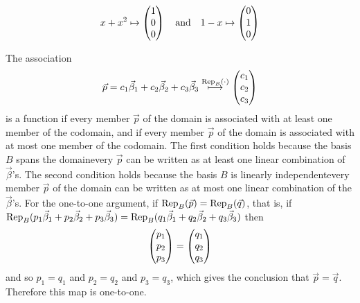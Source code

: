 \begin{exercises}
\begin{exparts}
\begin{equation*}
          x+x^2\mapsto\colvec{1 \\ 0 \\ 0}
          \quad\text{and}\quad
          1-x\mapsto\colvec{0 \\ 1 \\ 0}
        \end{equation*}
    \end{exparts}
    \begin{answer}
      \begin{exparts}
        \partsitem The association
          \begin{equation*}
            \vec{p}=c_1\vec{\beta}_1+c_2\vec{\beta}_2+c_3\vec{\beta}_3
            \mapsunder{\rep{\cdot}{B}}
            \colvec{c_1 \\ c_2 \\ c_3}
          \end{equation*}
          is a function if every member $\vec{p}$ of the domain is associated
          with at least one member of the codomain, and if every member
          $\vec{p}$ of the
          domain is associated with at most one member of the codomain.
          The first condition
          holds because the basis $B$ spans the domain\Dash every
          $\vec{p}$ can be written as at least one linear combination of
          $\vec{\beta}$'s.
          The second condition holds because the basis $B$ is linearly
          independent\Dash every member $\vec{p}$ 
          of the domain can be written as
          at most one linear combination of the $\vec{\beta}$'s.
        \partsitem For the one-to-one argument,
          if $\rep{\vec{p}}{B}=\rep{\vec{q}}{B}$, that is, if
          \( \rep{p_1\vec{\beta}_1+p_2\vec{\beta}_2+p_3\vec{\beta}_3}{B}
             =\rep{q_1\vec{\beta}_1+q_2\vec{\beta}_2+q_3\vec{\beta}_3}{B} \)
          then
          \begin{equation*}
            \colvec{p_1 \\ p_2 \\ p_3}
            =\colvec{q_1 \\ q_2 \\ q_3}
          \end{equation*}
          and so \( p_1=q_1 \) and \( p_2=q_2 \) and \( p_3=q_3 \),
          which gives the conclusion that $\vec{p}=\vec{q}$.
          Therefore this map is one-to-one.


\end{exparts}
\end{answer}
\end{exercises}

